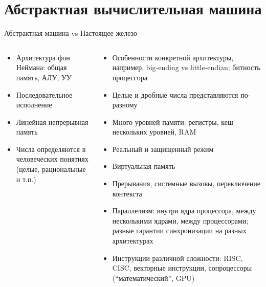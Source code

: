 \documentclass{beamer}
\begin{document}
\section{Абстрактная вычислительная машина}

\begin{frame}[t]{Абстрактная машина vs Настоящее железо}
\scriptsize
\begin{columns}[t]
\begin{column}{0.5\textwidth}
  \begin{itemize}
    \item Архитектура фон Неймана: общая память, АЛУ, УУ
    \item Последовательное исполнение
    \item Линейная непрерывная память
    \item Числа определяются в человеческих понятиях (целые, рациональные и т.п.)
  \end{itemize}
\end{column}
\begin{column}{0.5\textwidth}
  \begin{itemize}
    \item Особенности конкретной архитектуры, например, big-ending vs little-endian; битность процессора
    \item Целые и дробные числа представляются по-разному
    \item Много уровней памяти: регистры, кеш нескольких уровней, RAM
    \item Реальный и защищенный режим
    \item Виртуальная память
    \item Прерывания, системные вызовы, переключение контекста
    \item Параллелизм: внутри ядра процессора, между несколькими ядрами, между процессорами; разные гарантии синхронизации на разных архитектурах
    \item Инструкции различной сложности: RISC, CISC, векторные инструкции, сопроцессоры (“математический”, GPU)
  \end{itemize}
\end{column}
\end{columns}
\normalsize
\end{frame}
\end{document}
